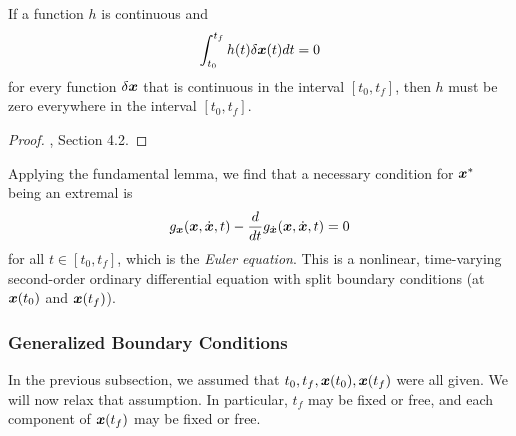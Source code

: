 \begin{lemma}
If a function $h$ is continuous and 
\begin{equation}
    \int_{t_0}^{t_f} h(t) \delta \bm{x}(t) dt = 0
\end{equation}
for every function $\delta \bm{x}$ that is continuous in the interval $[t_0,t_f]$, then $h$ must be zero everywhere in the interval $[t_0,t_f]$.
\end{lemma}

\begin{proof}
\cite{kirk2012optimal}, Section 4.2.
\end{proof}

Applying the fundamental lemma, we find that a necessary condition for $\bm{x}^*$ being an extremal is 
\begin{equation}
    g_{\bm{x}}(\bm{x},\dot{\bm{x}},t) - \frac{d}{dt} g_{\dot{\bm{x}}}(\bm{x},\dot{\bm{x}},t) = 0
\end{equation}
for all $t \in [t_0, t_f]$, which is the \textit{Euler equation}. This is a nonlinear, time-varying second-order ordinary differential equation with split boundary conditions (at $\bm{x}(t_0)$ and $\bm{x}(t_f)$).

\subsubsection{Generalized Boundary Conditions}

In the previous subsection, we assumed that $t_0, t_f, \bm{x}(t_0), \bm{x}(t_f)$ were all given. We will now relax that assumption. In particular, $t_f$ may be fixed or free, and each component of $\bm{x}(t_f)$ may be fixed or free. 

